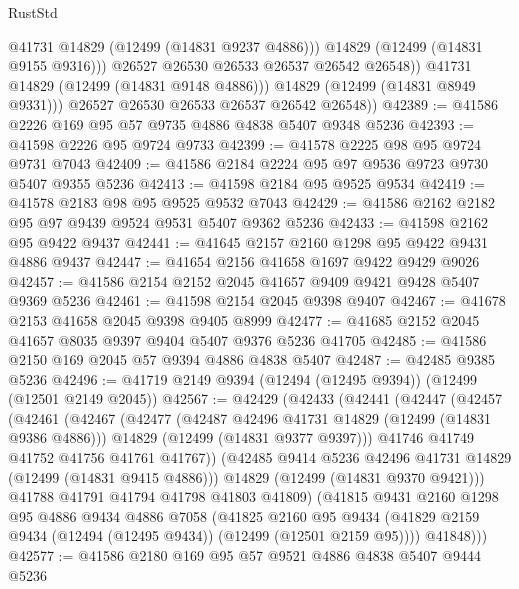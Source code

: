 \begin{lexlean}{RustStd}
\begin{coremodule}
                    @41731
                    @14829
                    (@12499 (@14831 @9237 @4886)))
                  @14829
                  (@12499 (@14831 @9155 @9316)))
                @26527
                @26530
                @26533
                @26537
                @26542
                @26548))
            @41731
            @14829
            (@12499 (@14831 @9148 @4886)))
          @14829
          (@12499 (@14831 @8949 @9331)))
        @26527
        @26530
        @26533
        @26537
        @26542
        @26548))
@42389 := @41586 @2226 @169 @95 @57 @9735 @4886 @4838 @5407 @9348 @5236
@42393 := @41598 @2226 @95 @9724 @9733
@42399 := @41578 @2225 @98 @95 @9724 @9731 @7043
@42409 := @41586 @2184 @2224 @95 @97 @9536 @9723 @9730 @5407 @9355 @5236
@42413 := @41598 @2184 @95 @9525 @9534
@42419 := @41578 @2183 @98 @95 @9525 @9532 @7043
@42429 := @41586 @2162 @2182 @95 @97 @9439 @9524 @9531 @5407 @9362 @5236
@42433 := @41598 @2162 @95 @9422 @9437
@42441 := @41645 @2157 @2160 @1298 @95 @9422 @9431 @4886 @9437
@42447 := @41654 @2156 @41658 @1697 @9422 @9429 @9026
@42457 := @41586 @2154 @2152 @2045 @41657 @9409 @9421 @9428 @5407 @9369 @5236
@42461 := @41598 @2154 @2045 @9398 @9407
@42467 := @41678 @2153 @41658 @2045 @9398 @9405 @8999
@42477 := @41685 @2152 @2045 @41657 @8035 @9397 @9404 @5407 @9376 @5236 @41705
@42485 := @41586 @2150 @169 @2045 @57 @9394 @4886 @4838 @5407
@42487 := @42485 @9385 @5236
@42496 := @41719 @2149 @9394 (@12494 (@12495 @9394)) (@12499 (@12501 @2149 @2045))
@42567 := @42429
    (@42433
      (@42441
        (@42447
          (@42457
            (@42461
              (@42467
                (@42477
                  (@42487 @42496 @41731 @14829 (@12499 (@14831 @9386 @4886)))
                  @14829
                  (@12499 (@14831 @9377 @9397)))
                @41746
                @41749
                @41752
                @41756
                @41761
                @41767))
            (@42485 @9414 @5236 @42496 @41731 @14829 (@12499 (@14831 @9415 @4886)))
            @14829
            (@12499 (@14831 @9370 @9421)))
          @41788
          @41791
          @41794
          @41798
          @41803
          @41809)
        (@41815
          @9431
          @2160
          @1298
          @95
          @4886
          @9434
          @4886
          @7058
          (@41825
            @2160
            @95
            @9434
            (@41829 @2159 @9434 (@12494 (@12495 @9434)) (@12499 (@12501 @2159 @95))))
          @41848)))
@42577 := @41586 @2180 @169 @95 @57 @9521 @4886 @4838 @5407 @9444 @5236

\end{coremodule}
\end{lexlean}
